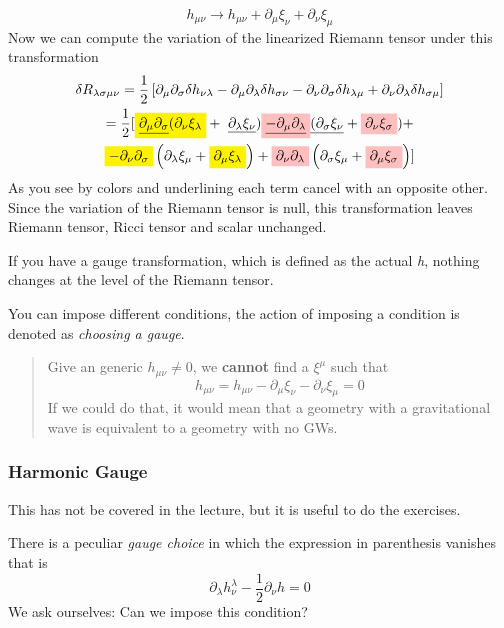 \[
h_{\mu \nu }\to h_{\mu \nu }+\partial_{\mu }\xi _{\nu }+\partial_{\nu }\xi _{\mu }
\]
Now we can compute the variation of the linearized Riemann tensor under this transformation
\begin{gather*}
	\delta R_{\lambda \sigma \mu \nu } = \frac{1}{2}\left[ \partial_{\mu }\partial_{\sigma }\delta h_{\nu \lambda } - \partial_{\mu }\partial_{\lambda }\delta h_{\sigma \nu } - \partial_{\nu }\partial_{\sigma }\delta h_{\lambda \mu } + \partial_{\nu }\partial_{\lambda }\delta h_{\sigma \mu } \right]\\
	= \frac{1}{2}[ \colorbox{yellow}{\underline{$ \partial_{\mu }\partial_{\sigma }$}$( \partial_{\nu }\xi _{\lambda }$}+ \text{ \underline{$\partial_{\lambda }\xi _{\nu }$}} ) \colorbox{pink}{\underline{$-  \partial_{\mu }\partial_{\lambda }$}}\text{\underline{$( \partial_{\sigma }\xi _{\nu }$}}+ \colorbox{pink}{$ \partial_{\nu }\xi _{\sigma }$}) + \\
	\colorbox{yellow}{$ - \partial_{\nu }\partial_{\sigma }$}\left( \partial_{\lambda }\xi _{\mu }+ \colorbox{yellow}{$ \partial_{\mu }\xi _{\lambda } $}\right) + \colorbox{pink}{$ \partial_{\nu }\partial_{\lambda }$}\left( \partial_{\sigma }\xi _{\mu }+ \colorbox{pink}{$ \partial_{\mu }\xi _{\sigma }$} \right) ] 
\end{gather*}
As you see by colors and underlining each term cancel with an opposite other. Since the variation of the Riemann tensor is null, this transformation leaves Riemann tensor, Ricci tensor and scalar unchanged.\par

If you have a gauge transformation, which is defined as the actual \emph{h}, nothing changes at the level of the Riemann tensor.\par
You can impose different conditions, the action of imposing a condition is denoted as \emph{choosing a gauge}. 
\begin{quote}
Give an generic $h_{\mu \nu } \neq 0$, we \textbf{cannot} find a $\xi ^{\mu }$ such that 
\[
h_{\mu \nu } = h_{\mu \nu } -\partial_{\mu }\xi _{\nu }-\partial_{\nu }\xi _{\mu } = 0
\]
If we could do that, it would mean that a geometry with a gravitational wave is equivalent to a geometry with no GWs.
\end{quote}

\subsubsection{Harmonic Gauge}
This has not be covered in the lecture, but it is useful to do the exercises.\par
There is a peculiar \emph{gauge choice} in which the expression in parenthesis vanishes that is 
\[
	\partial_{\lambda }h^{\lambda }_{\nu } - \frac{1}{2} \partial_{\nu }h= 0
\]
We ask ourselves: Can we impose this condition?\par

